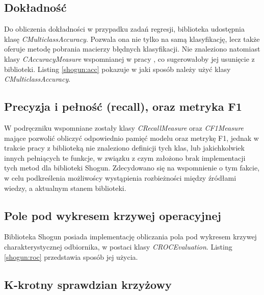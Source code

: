 
\subsection{Dokładność}

Do obliczenia dokładności w przypadku zadań regresji, biblioteka udostępnia klasę \textit{CMulticlassAccuracy}. Pozwala ona nie tylko na samą klasyfikację, lecz także oferuje metodę pobrania macierzy błędnych klasyfikacji. Nie znaleziono natomiast klasy \textit{CAccuracyMeasure} wspomnianej w pracy \cite{handsOnMachineLearning}, co sugerowałoby jej usunięcie z biblioteki. Listing \ref{shogun:acc} pokazuje w jaki sposób należy użyć klasy \textit{CMulticlassAccuracy}.


\subsection{Precyzja i pełność (recall), oraz metryka F1}

W podręczniku \cite{handsOnMachineLearning} wspomniane zostały klasy \textit{CRecallMeasure} oraz \textit{CF1Measure} mające pozwolić obliczyć odpowiednio pamięć modelu oraz metrykę F1, jednak w trakcie pracy z biblioteką nie znaleziono definicji tych klas, lub jakichkolwiek innych pełniących te funkcje, w związku z czym założono brak implementacji tych metod dla biblioteki Shogun. Zdecydowano się na wspomnienie o tym fakcie, w celu podkreślenia możliwoścy wystąpienia rozbieżności między źródłami wiedzy, a aktualnym stanem biblioteki.

\subsection{Pole pod wykresem krzywej operacyjnej}

Biblioteka Shogun posiada implementację obliczania pola pod wykresem krzywej charakterystycznej odbiornika, w postaci klasy \textit{CROCEvaluation}. Listing \ref{shogun:roc} przedstawia sposób jej użycia.


\subsection{K-krotny sprawdzian krzyżowy}


